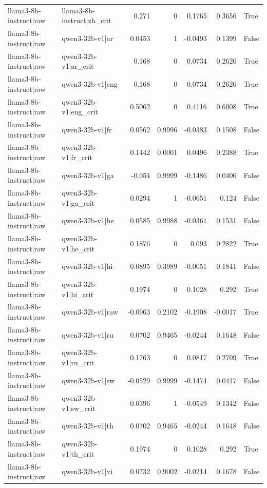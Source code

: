 \begin{table}
\begin{tabular}{l l r r r r l}
llama3-8b-instruct|raw & llama3-8b-instruct|zh_crit & 0.271 & 0 & 0.1765 & 0.3656 & True \\
llama3-8b-instruct|raw & qwen3-32b-v1|ar & 0.0453 & 1 & -0.0493 & 0.1399 & False \\
llama3-8b-instruct|raw & qwen3-32b-v1|ar_crit & 0.168 & 0 & 0.0734 & 0.2626 & True \\
llama3-8b-instruct|raw & qwen3-32b-v1|eng & 0.168 & 0 & 0.0734 & 0.2626 & True \\
llama3-8b-instruct|raw & qwen3-32b-v1|eng_crit & 0.5062 & 0 & 0.4116 & 0.6008 & True \\
llama3-8b-instruct|raw & qwen3-32b-v1|fr & 0.0562 & 0.9996 & -0.0383 & 0.1508 & False \\
llama3-8b-instruct|raw & qwen3-32b-v1|fr_crit & 0.1442 & 0.0001 & 0.0496 & 0.2388 & True \\
llama3-8b-instruct|raw & qwen3-32b-v1|ga & -0.054 & 0.9999 & -0.1486 & 0.0406 & False \\
llama3-8b-instruct|raw & qwen3-32b-v1|ga_crit & 0.0294 & 1 & -0.0651 & 0.124 & False \\
llama3-8b-instruct|raw & qwen3-32b-v1|he & 0.0585 & 0.9988 & -0.0361 & 0.1531 & False \\
llama3-8b-instruct|raw & qwen3-32b-v1|he_crit & 0.1876 & 0 & 0.093 & 0.2822 & True \\
llama3-8b-instruct|raw & qwen3-32b-v1|hi & 0.0895 & 0.3989 & -0.0051 & 0.1841 & False \\
llama3-8b-instruct|raw & qwen3-32b-v1|hi_crit & 0.1974 & 0 & 0.1028 & 0.292 & True \\
llama3-8b-instruct|raw & qwen3-32b-v1|raw & -0.0963 & 0.2102 & -0.1908 & -0.0017 & True \\
llama3-8b-instruct|raw & qwen3-32b-v1|ru & 0.0702 & 0.9465 & -0.0244 & 0.1648 & False \\
llama3-8b-instruct|raw & qwen3-32b-v1|ru_crit & 0.1763 & 0 & 0.0817 & 0.2709 & True \\
llama3-8b-instruct|raw & qwen3-32b-v1|sw & -0.0529 & 0.9999 & -0.1474 & 0.0417 & False \\
llama3-8b-instruct|raw & qwen3-32b-v1|sw_crit & 0.0396 & 1 & -0.0549 & 0.1342 & False \\
llama3-8b-instruct|raw & qwen3-32b-v1|th & 0.0702 & 0.9465 & -0.0244 & 0.1648 & False \\
llama3-8b-instruct|raw & qwen3-32b-v1|th_crit & 0.1974 & 0 & 0.1028 & 0.292 & True \\
llama3-8b-instruct|raw & qwen3-32b-v1|vi & 0.0732 & 0.9002 & -0.0214 & 0.1678 & False \\

\end{tabular}
\end{table}
